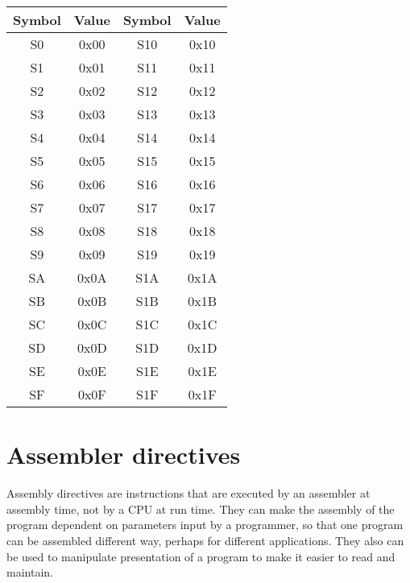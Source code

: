         \begin{table}[h!]
            \begin{tabular}{|cc|cc|}
                \hline
                Symbol & Value & Symbol & Value \\\hline
                S0     & 0x00  & S10    & 0x10  \\\hline
                S1     & 0x01  & S11    & 0x11  \\\hline
                S2     & 0x02  & S12    & 0x12  \\\hline
                S3     & 0x03  & S13    & 0x13  \\\hline
                S4     & 0x04  & S14    & 0x14  \\\hline
                S5     & 0x05  & S15    & 0x15  \\\hline
                S6     & 0x06  & S16    & 0x16  \\\hline
                S7     & 0x07  & S17    & 0x17  \\\hline
                S8     & 0x08  & S18    & 0x18  \\\hline
                S9     & 0x09  & S19    & 0x19  \\\hline
                SA     & 0x0A  & S1A    & 0x1A  \\\hline
                SB     & 0x0B  & S1B    & 0x1B  \\\hline
                SC     & 0x0C  & S1C    & 0x1C  \\\hline
                SD     & 0x0D  & S1D    & 0x1D  \\\hline
                SE     & 0x0E  & S1E    & 0x1E  \\\hline
                SF     & 0x0F  & S1F    & 0x1F  \\\hline
            \end{tabular}
        \end{table}

\section{Assembler directives}
    Assembly directives are instructions that are executed by an assembler at assembly time, not by a CPU at run time. They can make the assembly of the program dependent on parameters input by a programmer, so that one program can be assembled different way, perhaps for different applications. They also can be used to manipulate presentation of a program to make it easier to read and maintain.

